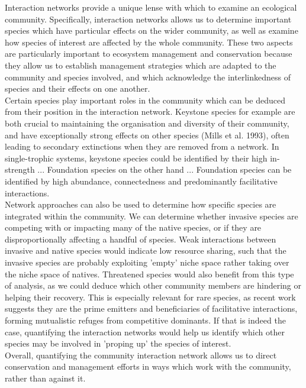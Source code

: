 \documentclass[a4,12pt]{article}
\begin{document}
        Interaction networks provide a unique lense with which to examine an ecological community. Specifically, interaction networks allows us to determine important species which have particular effects on the wider community, as well as examine how species of interest are affected by the whole community. These two aspects are particularly important to ecosystem management and conservation because they allow us to establish management strategies which are adapted to the community and species involved, and which acknowledge the interlinkedness of species and their effects on one another. \\

        Certain species play important roles in the community which can be deduced from their position in the interaction network. Keystone species for example are both crucial to maintaining the organisation and diversity of their community, and have exceptionally strong effects on other species (Mills et al. 1993), often leading to secondary extinctions when they are removed from a network. In single-trophic systems, keystone species could be identified by their high in-strength ... Foundation species on the other hand ... Foundation species can be identified by high abundance, connectedness and predominantly facilitative interactions.  \\

        Network approaches can also be used to determine how specific species are integrated within the community. We can determine whether invasive species are competing with or impacting many of the native species, or if they are disproportionally affecting a handful of species. Weak interactions between invasive and native species would indicate low resource sharing, such that the invasive species are probably exploiting 'empty' niche space rather taking over the niche space of natives. Threatened species would also benefit from this type of analysis, as we could deduce which other community members are hindering or helping their recovery. This is especially relevant for rare species, as recent work suggests they are the prime emitters and beneficiaries of facilitative interactions, forming mutualistic refuges from competitive dominants. If that is indeed the case, quantifying the interaction networks would help us identify which other species may be involved in 'proping up' the species of interest. \\

        Overall, quantifying the community interaction network allows us to direct conservation and management efforts in ways which work with the community, rather than against it.
\end{document}
